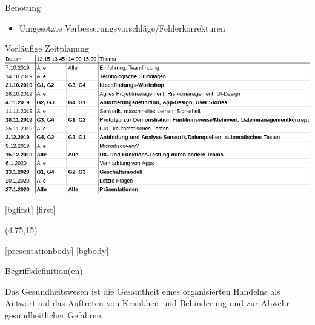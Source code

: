 \documentclass[aspectratio=169,t]{beamer}
\begin{document}
\begin{frame}{Benotung}
\begin{itemize}
        \item<6-> Umgesetzte Verbesserungsvorschläge/Fehlerkorrekturen
    \end{itemize}
\end{frame}

\begin{frame}{Vorläufige Zeitplanung}
    \includegraphics[width=\textwidth]{Bilder/Zeitplan.png}
\end{frame}

[bgfirst]
[first]
\subtitle{\theslidesection: Kurzer Einblick in das Gesundheitssystem}
\begin{frame}[noframenumbering]
\titlepage
\begin{textblock}{10}(4.75,15)
\cite{GesundheitssystemLogo}
\end{textblock}
\end{frame}
[presentationbody] 
[bgbody]

\begin{frame}{Begriffsdefinition(en)}
    \begin{definition}
        Das Gesundheitswesen ist die Gesamtheit eines organisierten Handelns als Antwort auf das Auftreten von Krankheit und Behinderung und zur Abwehr gesundheitlicher Gefahren.
    \end{definition}
\end{frame}
\end{document}
